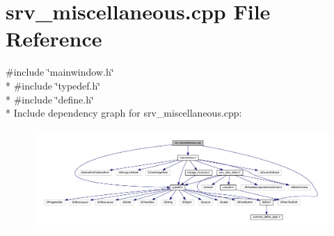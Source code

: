 \hypertarget{a00048}{\section{srv\+\_\+miscellaneous.\+cpp File Reference}
\label{a00048}
}
{\ttfamily \#include \char`\"{}mainwindow.\+h\char`\"{}}\\*
{\ttfamily \#include \char`\"{}typedef.\+h\char`\"{}}\\*
{\ttfamily \#include \char`\"{}define.\+h\char`\"{}}\\*
Include dependency graph for srv\+\_\+miscellaneous.\+cpp\+:
\nopagebreak
\begin{figure}[H]
\begin{center}
\leavevmode
\includegraphics[width=350pt]{d3/de5/a00209}
\end{center}
\end{figure}
